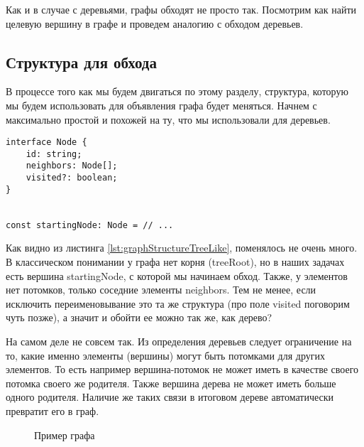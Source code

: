 \documentclass[../../article.tex]{subfiles}
\begin{document}

{Как и в случае с деревьями, графы обходят не просто так. Посмотрим как найти целевую вершину в графе и проведем аналогию с обходом деревьев.}

\subsection{Структура для обхода}

В процессе того как мы будем двигаться по этому разделу, структура, которую мы будем использовать для объявления графа будет меняться. Начнем с максимально простой и похожей на ту, что мы использовали для деревьев.

\begin{ruledelement}
    \begin{lstlisting}[caption={Структура вершины графа}, label={lst:graphStructureTreeLike}]
interface Node {
    id: string;
    neighbors: Node[];
    visited?: boolean;
}


const startingNode: Node = // ...
    \end{lstlisting}
\end{ruledelement}

Как видно из листинга \ref{lst:graphStructureTreeLike}, поменялось не очень много. В классическом понимании у графа нет корня ({\firacodebold treeRoot}), но в наших задачах есть вершина {\firacodebold startingNode}, с которой мы начинаем обход. Также, у элементов нет потомков, только соседние элементы {\firacodebold neighbors}. Тем не менее, если исключить переименовывание это та же структура (про поле {\firacodebold visited} поговорим чуть позже), а значит и обойти ее можно так же, как дерево?

На самом деле не совсем так. Из определения деревьев следует ограничение на то, какие именно элементы (вершины) могут быть потомками для других элементов. То есть например вершина-потомок не может иметь в качестве своего потомка своего же родителя. Также вершина дерева не может иметь больше одного родителя. Наличие же таких связи в итоговом дереве автоматически превратит его в граф.

\begin{figure}
    \caption{Пример графа}
    \label{fig:treeTurningToGraph}
\end{figure}
\end{document}
